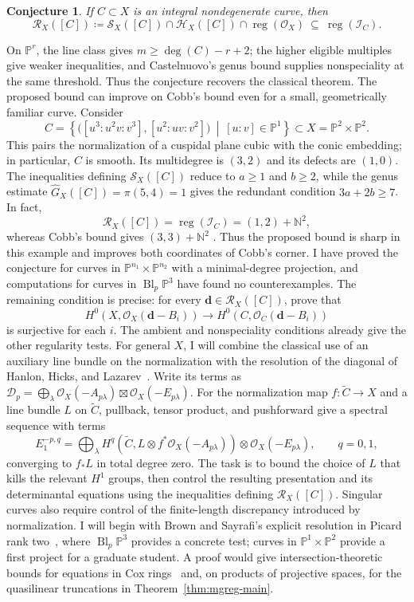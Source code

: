 \documentclass[11pt,reqno]{amsart}
\newtheorem{conjecture}[lemma]{Conjecture}
\theoremstyle{remark}
\newcommand{\reg}{\operatorname{reg}}
\newcommand{\Bl}{\operatorname{Bl}}
\newcommand{\dd}{\mathbf{d}}
\newcommand{\NN}{\mathbb{N}}
\newcommand{\PP}{\mathbb{P}}
\newcommand{\cD}{\mathcal{D}}
\newcommand{\cH}{\mathcal{H}}
\newcommand{\cI}{\mathcal{I}}
\newcommand{\cO}{\mathcal{O}}
\newcommand{\cR}{\mathcal{R}}
\newcommand{\cS}{\mathcal{S}}
\begin{document}
\begin{conjecture}\label{conj:multigraded-glp}
If $C\subset X$ is an integral nondegenerate curve, then
\[
\cR_X([C])\coloneqq\cS_X([C])\cap\cH_X([C])\cap\reg(\cO_X)\ \subseteq\ \reg(\cI_C).
\]
\end{conjecture}

On $\PP^r$, the line class gives $m\geq\deg(C)-r+2$; the higher eligible multiples give weaker inequalities, and Castelnuovo's genus bound supplies nonspeciality at the same threshold. Thus the conjecture recovers the classical theorem. The proposed bound can improve on Cobb's bound even for a small,
geometrically familiar curve. Consider
\[
C=\left\{
\bigl([u^3:u^2v:v^3],[u^2:uv:v^2]\bigr)
\ \middle|\ [u:v]\in\PP^1
\right\}
\subset X=\PP^2\times\PP^2.
\]
This pairs the normalization of a cuspidal plane cubic with the conic
embedding; in particular, $C$ is smooth. Its multidegree is $(3,2)$
and its defects are $(1,0)$. The inequalities defining
$\cS_X([C])$ reduce to $a\geq1$ and $b\geq2$, while the genus estimate
$\widehat G_X([C])=\pi(5,4)=1$ gives the redundant condition
$3a+2b\geq7$. In fact,
\[
\cR_X([C])=\reg(\cI_C)=(1,2)+\NN^2,
\]
whereas Cobb's bound gives $(3,3)+\NN^2$
\cite[Proposition~B]{cobb24}. Thus the proposed bound is sharp
in this example and improves both coordinates of Cobb's corner.
I have proved the conjecture for curves in $\PP^{n_1}\times\PP^{n_2}$ with a minimal-degree projection, and computations for curves in $\Bl_p\PP^3$ have found no counterexamples. The remaining condition is precise: for every $\dd\in\cR_X([C])$, prove that
\[
H^0(X,\cO_X(\dd-B_i))\longrightarrow H^0(C,\cO_C(\dd-B_i))
\]
is surjective for each $i$. The ambient and nonspeciality conditions already give the other regularity tests. For general $X$, I will combine the classical use of an auxiliary line bundle on the normalization with the resolution of the diagonal of Hanlon, Hicks, and Lazarev~\cite{GLP83,cobb24,HHL24}. Write its terms as $\cD_p=\bigoplus_\lambda\cO_X(-A_{p\lambda})\boxtimes\cO_X(-E_{p\lambda})$. For the normalization map $f\colon\widetilde C\to X$ and a line bundle $L$ on $\widetilde C$, pullback, tensor product, and pushforward give a spectral sequence with terms
\[
E_1^{-p,q}=\bigoplus_\lambda
H^q\!\left(\widetilde C,L\otimes f^*\cO_X(-A_{p\lambda})\right)
\otimes\cO_X(-E_{p\lambda}),\qquad q=0,1,
\]
converging to $f_*L$ in total degree zero. The task is to bound the choice of $L$ that kills the relevant $H^1$ groups, then control the resulting presentation and its determinantal equations using the inequalities defining $\cR_X([C])$. Singular curves also require control of the finite-length discrepancy introduced by normalization. I will begin with Brown and Sayrafi's explicit resolution in Picard rank two~\cite{brownSayrafi24}, where $\Bl_p\PP^3$ provides a concrete test; curves in $\PP^1\times\PP^2$ provide a first project for a graduate student. A proof would give intersection-theoretic bounds for equations in Cox rings~\cite{maclaganSmith04} and, on products of projective spaces, for the quasilinear truncations in Theorem~\ref{thm:mgreg-main}.
\end{document}
